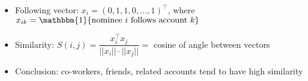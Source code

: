 \documentclass{slides}
\begin{document}
	\large
	\begin{itemize}
		\item Following vector: $x_i = (0, 1, 1, 0, \ldots, 1)^\top$,
		where $x_{ik} = \mathbbm{1} \{\text{nominee $i$ follows account $k$}\}$
		\item Similarity: $S(i, j) = \dfrac{x_i^\top x_j} {||x_i|| \cdot ||x_j||} = $ cosine of angle between vectors
		\item Conclusion: co-workers, friends, related accounts tend to have high similarity
	\end{itemize}
\end{document}
